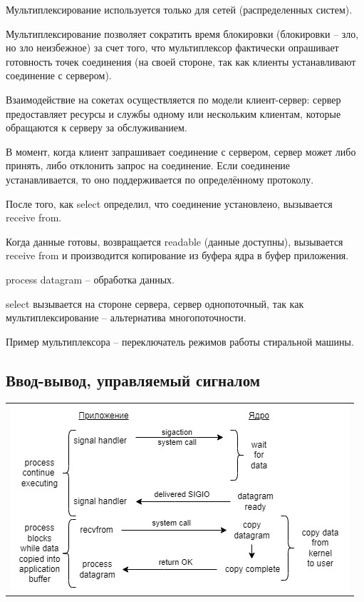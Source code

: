 Мультиплексирование используется только для сетей (распределенных систем).

Мультиплексирование позволяет сократить время блокировки (блокировки – зло, но зло неизбежное) за счет того, что мультиплексор фактически опрашивает готовность точек соединения (на своей стороне, так как клиенты устанавливают соединение с сервером).

Взаимодействие на сокетах осуществляется по модели клиент-сервер: сервер предоставляет ресурсы и службы одному или нескольким клиентам, которые обращаются к серверу за обслуживанием. 

В момент, когда клиент запрашивает соединение с сервером, сервер может либо принять, либо отклонить запрос на соединение. Если соединение устанавливается, то оно поддерживается по определённому протоколу.

После того, как select определил, что соединение установлено, вызывается receive from.

Когда данные готовы, возвращается readable (данные доступны), вызывается receive from и производится копирование из буфера ядра в буфер приложения.

process datagram – обработка данных.

select вызывается на стороне сервера, сервер однопоточный, так как мультиплексирование – альтернатива многопоточности.

Пример мультиплексора – переключатель режимов работы стиральной машины.

\subsection{Ввод-вывод, управляемый сигналом}

\begin{table}[H]
  \centering
  \begin{tabular}{p{1\linewidth}}
    \centering
    \includegraphics[width=0.8\linewidth]{./images/1-4.png}
  \end{tabular}
\end{table}

